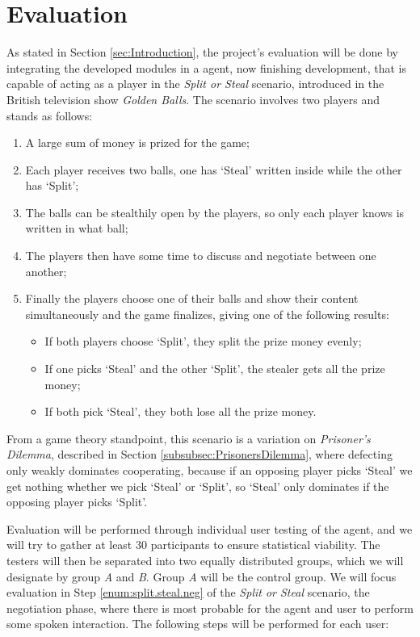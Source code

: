 \section{Evaluation}
\label{sec:Evaluation}
As stated in Section \ref{sec:Introduction}, the project's evaluation will be done by integrating the developed modules in a agent, now finishing development, that is capable of acting as a player in the \textit{Split or Steal} scenario, introduced in the British television show \textit{Golden Balls}\cite{Wikipedia.Golden.Balls}. The scenario involves two players and stands as follows:
\begin{enumerate}
	\item A large sum of money is prized for the game;
	\item Each player receives two balls, one has `Steal' written inside while the other has `Split';
	\item The balls can be stealthily open by the players, so only each player knows is written in what ball;
	\item \label{enum:split.steal.neg}The players then have some time to discuss and negotiate between one another;
	\item Finally the players choose one of their balls and show their content simultaneously and the game finalizes, giving one of the following results:
	\begin{itemize}
		\item If both players choose `Split', they split the prize money evenly;
		\item If one picks `Steal' and the other `Split', the stealer gets all the prize money;
		\item If both pick `Steal', they both lose all the prize money.
	\end{itemize}	
\end{enumerate}

From a game theory standpoint, this scenario is a variation on \textit{Prisoner's Dilemma}, described in Section \ref{subsubsec:PrisonersDilemma}, where defecting only weakly dominates cooperating, because if an opposing player picks `Steal' we get nothing whether we pick `Steal' or `Split', so `Steal' only dominates if the opposing player picks `Split'.

Evaluation will be performed through individual user testing of the agent, and we will try to gather at least 30 participants to ensure statistical viability. The testers will then be separated into two equally distributed groups, which we will designate by group \textit{A} and \textit{B}. Group \textit{A} will be the control group. We will focus evaluation in Step \ref{enum:split.steal.neg} of the \textit{Split or Steal} scenario, the negotiation phase, where there is most probable for the agent and user to perform some spoken interaction. The following steps will be performed for each user:


